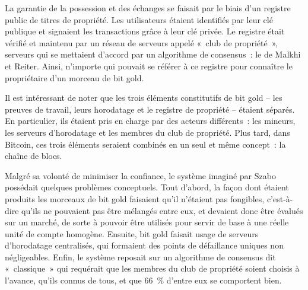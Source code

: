La garantie de la possession et des échanges se faisait par le biais d'un registre public de titres de propriété. Les utilisateurs étaient identifiés par leur clé publique et signaient les transactions grâce à leur clé privée. Le registre était vérifié et maintenu par un réseau de serveurs appelé «~club de propriété~», serveurs qui se mettaient d'accord par un algorithme de consensus~: le  de Malkhi et Reiter. Ainsi, n'importe qui pouvait se référer à ce registre pour connaître le propriétaire d'un morceau de bit gold.

Il est intéressant de noter que les trois éléments constitutifs de bit gold -- les preuves de travail, leurs horodatage et le registre de propriété -- étaient séparés. En particulier, ils étaient pris en charge par des acteurs différents~: les mineurs, les serveurs d'horodatage et les membres du club de propriété. Plus tard, dans Bitcoin, ces trois éléments seraient combinés en un seul et même concept~: la chaîne de blocs.

Malgré sa volonté de minimiser la confiance, le système imaginé par Szabo possédait quelques problèmes conceptuels. Tout d'abord, la façon dont étaient produits les morceaux de bit gold faisaient qu'il n'étaient pas fongibles, c'est-à-dire qu'ils ne pouvaient pas être mélangés entre eux, et devaient donc être évalués sur un marché, de sorte à pouvoir être utilisés pour servir de base à une réelle unité de compte homogène. Ensuite, bit gold faisait usage de serveurs d'horodatage centralisés, qui formaient des points de défaillance uniques non négligeables. Enfin, le système reposait sur un algorithme de consensus dit «~classique~» qui requérait que les membres du club de propriété soient choisis à l'avance, qu'ils connus de tous, et que 66~\% d'entre eux se comportent bien.

